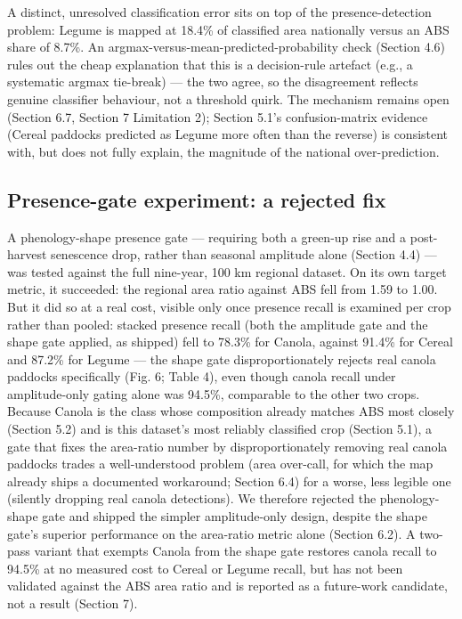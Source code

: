 A distinct, unresolved classification error sits on top of the presence-detection problem: Legume is mapped at 18.4\% of classified area nationally versus an ABS share of 8.7\%. An argmax-versus-mean-predicted-probability check (Section 4.6) rules out the cheap explanation that this is a decision-rule artefact (e.g., a systematic argmax tie-break) --- the two agree, so the disagreement reflects genuine classifier behaviour, not a threshold quirk. The mechanism remains open (Section 6.7, Section 7 Limitation 2); Section 5.1's confusion-matrix evidence (Cereal paddocks predicted as Legume more often than the reverse) is consistent with, but does not fully explain, the magnitude of the national over-prediction.

\subsection{Presence-gate experiment: a rejected fix}\label{presence-gate-experiment-a-rejected-fix}

A phenology-shape presence gate --- requiring both a green-up rise and a post-harvest senescence drop, rather than seasonal amplitude alone (Section 4.4) --- was tested against the full nine-year, 100 km regional dataset. On its own target metric, it succeeded: the regional area ratio against ABS fell from 1.59 to 1.00. But it did so at a real cost, visible only once presence recall is examined per crop rather than pooled: stacked presence recall (both the amplitude gate and the shape gate applied, as shipped) fell to 78.3\% for Canola, against 91.4\% for Cereal and 87.2\% for Legume --- the shape gate disproportionately rejects real canola paddocks specifically (Fig. 6; Table 4), even though canola recall under amplitude-only gating alone was 94.5\%, comparable to the other two crops. Because Canola is the class whose composition already matches ABS most closely (Section 5.2) and is this dataset's most reliably classified crop (Section 5.1), a gate that fixes the area-ratio number by disproportionately removing real canola paddocks trades a well-understood problem (area over-call, for which the map already ships a documented workaround; Section 6.4) for a worse, less legible one (silently dropping real canola detections). We therefore rejected the phenology-shape gate and shipped the simpler amplitude-only design, despite the shape gate's superior performance on the area-ratio metric alone (Section 6.2). A two-pass variant that exempts Canola from the shape gate restores canola recall to 94.5\% at no measured cost to Cereal or Legume recall, but has not been validated against the ABS area ratio and is reported as a future-work candidate, not a result (Section 7).


